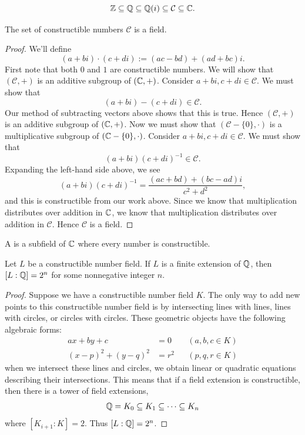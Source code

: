 \documentclass{ximera}
\begin{document}
\[
\mathbb Z\subseteq \mathbb Q \subseteq \mathbb Q(i) \subseteq \mathcal{C} \subseteq \mathbb C.
\]

\begin{lemma}
  The set of constructible numbers $\mathcal{C}$ is a field.
  \begin{proof}
    We'll define
    \[
    (a+ bi)\cdot(c+di) := (ac-bd) + (ad+bc)i.
    \]
    First note that both $0$ and $1$ are constructible numbers. We
    will show that $(\mathcal{C},+)$ is an additive subgroup of
    $(\mathbb C,+)$. Consider $a+ bi, c+di \in \mathcal{C}$. We must show
    that
    \[
    (a+ bi)-(c+di)\in \mathcal{C}.
    \]
    Our method of subtracting vectors above shows that this is
    true. Hence $(\mathcal{C},+)$ is an additive subgroup of
    $(\mathbb C,+)$. Now we must show that $(\mathcal{C}-\{0\},\cdot)$ is a
    multiplicative subgroup of $(\mathbb C-\{0\},\cdot)$. Consider $a+ bi,
    c+di \in \mathcal{C}$. We must show that
    \[
    (a+ bi)(c+di)^{-1} \in \mathcal{C}.
    \]
    Expanding the left-hand side above, we see
    \[
    (a+ bi)(c+di)^{-1} = \frac{(ac+bd) + (bc-ad)i}{c^2 + d^2},
    \]
    and this is constructible from our work above. Since we know that
    multiplication distributes over addition in $\mathbb C$, we know that
    multiplication distributes over addition in $\mathcal{C}$. Hence
    $\mathcal{C}$ is a field.
  \end{proof}
\end{lemma}


\begin{definition}
  A  is a subfield of $\mathbb C$ where every
  number is constructible.
\end{definition}

\begin{theorem}\label{T:dc}
  Let $L$ be a constructible number field. If $L$ is a finite
  extension of $\mathbb Q$, then $[L: \mathbb Q] = 2^n$ for some nonnegative integer
  $n$.
  \begin{proof}
    Suppose we have a constructible number field $K$. The only way to
    add new points to this constructible number field is by
    intersecting lines with lines, lines with circles, or circles with
    circles. These geometric objects have the following algebraic
    forms:
    \begin{align*}
      ax + by + c &= 0 & & (a,b,c\in K)\\
      (x-p)^2 + (y-q)^2 &= r^2 & & (p,q,r\in K)
    \end{align*}
    when we intersect these lines and circles, we obtain linear or
    quadratic equations describing their intersections. This means
    that if a field extension is constructible, then there is a tower
    of field extensions,
    \[
    \mathbb Q = K_0 \subseteq K_1 \subseteq \cdots \subseteq K_n
    \]
    where $[K_{i+1}:K] = 2$. Thus $[L:\mathbb Q]=2^n$.
  \end{proof}
\end{theorem}
\end{document}
